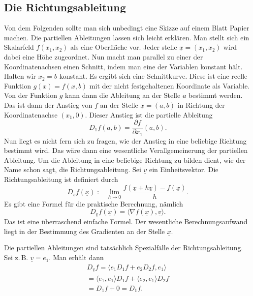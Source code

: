 \documentclass[a4paper,11pt,fleqn,twocolumn,twoside]{scrartcl}
\numberwithin{equation}{section}
\begin{document}
\subsection{Die Richtungsableitung}

Von dem Folgenden sollte man sich unbedingt eine Skizze auf einem
Blatt Papier machen. Die partiellen Ableitungen lassen sich leicht
erklären. Man stellt sich ein Skalarfeld $f(x_1,x_2)$ als eine
Oberfläche vor. Jeder stelle $\underline x=(x_1,x_2)$ wird dabei
eine Höhe zugeordnet. Nun macht man parallel zu einer der
Koordinatenachsen einen Schnitt, indem man eine der Variablen
konstant hält. Halten wir $x_2=b$ konstant. Es ergibt sich
eine Schnittkurve. Diese ist eine reelle Funktion $g(x)=f(x,b)$
mit der nicht festgehaltenen Koordinate als Variable.
Von der Funktion $g$ kann dann die Ableitung an der Stelle $a$
bestimmt werden. Das ist dann der Anstieg von $f$ an der Stelle
$\underline x=(a,b)$ in Richtung der Koordinatenachse $(x_1,0)$.
Dieser Anstieg ist die partielle Ableitung
\begin{equation}
D_1 f(a,b) = \frac{\partial f}{\partial x_1}(a,b).
\end{equation}
%
Nun liegt es nicht fern sich zu fragen, wie der Anstieg in eine
beliebige Richtung bestimmt wird. Das wäre dann eine wesentliche
Verallgemeinerung der partiellen Ableitung.
%
Um die Ableitung in eine beliebige Richtung zu bilden dient, wie der
Name schon sagt, die Richtungsableitung. Sei $\underline v$
ein Einheitsvektor. Die Richtungsableitung ist definiert durch
\begin{equation}
D_{\underline v} f(\underline x) := \lim_{h\rightarrow 0}
\frac{f(\underline x+h\underline v)-f(\underline x)}{h}.
\end{equation}
Es gibt eine Formel für die praktische Berechnung, nämlich
\begin{equation}
D_{\underline v} f(\underline x)
= \langle\nabla f(\underline x),\underline v\rangle.
\end{equation}
Das ist eine überraschend einfache Formel. Der wesentliche
Berechnungsaufwand liegt in der Bestimmung des Gradienten
an der Stelle $\underline x$.

Die partiellen Ableitungen sind tatsächlich Spezialfälle der
Richtungsableitung. Sei z.\,B. $\underline v=e_1$. Man erhält dann
\begin{gather*}
D_{\underline v} f
= \langle e_1 D_1f+e_2 D_2 f, e_1\rangle\\
= \langle e_1, e_1\rangle D_1f  + \langle e_2, e_1\rangle D_2 f\\
= D_1f+0 = D_1f.
\end{gather*}
\end{document}
